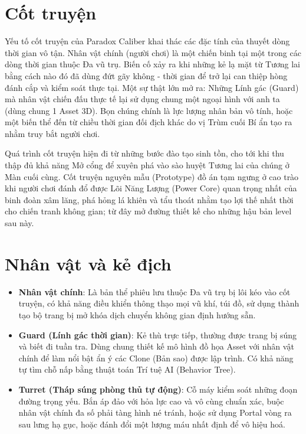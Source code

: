 \documentclass[../DoAn.tex]{subfiles}
\begin{document}
\section{Cốt truyện}
Yếu tố cốt truyện của Paradox Caliber khai thác các đặc tính của thuyết dòng thời gian vô tận. Nhân vật chính (người chơi) là một chiến binh tại một trong các dòng thời gian thuộc Đa vũ trụ. Biến cố xảy ra khi những kẻ lạ mặt từ Tương lai bằng cách nào đó đã dùng đứt gãy không - thời gian để trở lại can thiệp hòng đánh cắp và kiểm soát thực tại. Một sự thật lớn mở ra: Những Lính gác (Guard) mà nhân vật chiến đấu thực tế lại sử dụng chung một ngoại hình với anh ta (dùng chung 1 Asset 3D). Bọn chúng chính là lực lượng nhân bản vô tính, hoặc một biến thể đến từ chiều thời gian đối địch khác do vị Trùm cuối Bí ẩn tạo ra nhằm truy bắt người chơi.

Quá trình cốt truyện hiện đi từ những bước đào tạo sinh tồn, cho tới khi thu thập đủ khả năng Mở cổng để xuyên phá vào sào huyệt Tương lai của chúng ở Màn cuối cùng. Cốt truyện nguyên mẫu (Prototype) đồ án tạm ngưng ở cao trào khi người chơi đánh đổ được Lõi Năng Lượng (Power Core) quan trọng nhất của binh đoàn xâm lăng, phá hỏng lá khiên và tẩu thoát nhằm tạo lợi thế nhất thời cho chiến tranh không gian; từ đây mở đường thiết kế cho những hậu bản level sau này.

\section{Nhân vật và kẻ địch}
\begin{itemize}
    \item \textbf{Nhân vật chính}: Là bản thể phiêu lưu thuộc Đa vũ trụ bị lôi kéo vào cốt truyện, có khả năng điều khiển thông thạo mọi vũ khí, túi đồ, sử dụng thành tạo bộ trang bị mở khóa dịch chuyển không gian định hướng sẵn.
    \item \textbf{Guard (Lính gác thời gian)}: Kẻ thù trực tiếp, thường được trang bị súng và biết đi tuần tra. Dùng chung thiết kế mô hình đồ họa Asset với nhân vật chính để làm nổi bật ẩn ý các Clone (Bản sao) được lập trình. Có khả năng tự tìm chỗ nấp bằng thuật toán Trí tuệ AI (Behavior Tree).
    \item \textbf{Turret (Tháp súng phòng thủ tự động)}: Cỗ máy kiểm soát những đoạn đường trọng yếu. Bắn áp đảo với hỏa lực cao và vô cùng chuẩn xác, buộc nhân vật chính đa số phải tàng hình né tránh, hoặc sử dụng Portal vòng ra sau lưng hạ gục, hoặc đánh đổi một lượng máu nhất định để vô hiệu hoá.
\end{itemize}
\end{document}
